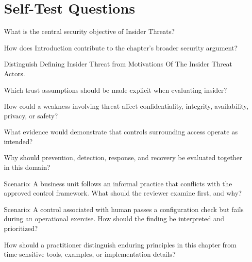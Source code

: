 \documentclass[11pt,letterpaper]{article}
\begin{document}
\section*{Self-Test Questions}
\begin{CornellRecallList}
\item What is the central security objective of Insider Threats?
\item How does Introduction contribute to the chapter's broader security argument?
\item Distinguish Defining Insider Threat from Motivations Of The Insider Threat Actors.
\item Which trust assumptions should be made explicit when evaluating insider?
\item How could a weakness involving threat affect confidentiality, integrity, availability, privacy, or safety?
\item What evidence would demonstrate that controls surrounding access operate as intended?
\item Why should prevention, detection, response, and recovery be evaluated together in this domain?
\item Scenario: A business unit follows an informal practice that conflicts with the approved control framework. What should the reviewer examine first, and why?
\item Scenario: A control associated with human passes a configuration check but fails during an operational exercise. How should the finding be interpreted and prioritized?
\item How should a practitioner distinguish enduring principles in this chapter from time-sensitive tools, examples, or implementation details?
\end{CornellRecallList}
\end{document}
